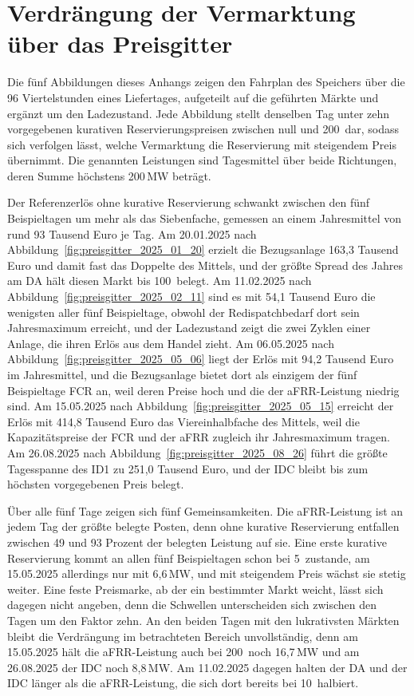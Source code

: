 \chapter{Verdrängung der Vermarktung über das Preisgitter}
\label{anh:preisgitter}

Die fünf Abbildungen dieses Anhangs zeigen den Fahrplan des Speichers über die 96 Viertelstunden eines Liefertages, aufgeteilt auf die geführten Märkte und ergänzt um den Ladezustand. Jede Abbildung stellt denselben Tag unter zehn vorgegebenen kurativen Reservierungspreisen zwischen null und 200\,\EurMWh{} dar, sodass sich verfolgen lässt, welche Vermarktung die Reservierung mit steigendem Preis übernimmt. Die genannten Leistungen sind Tagesmittel über beide Richtungen, deren Summe höchstens 200\,\si{MW} beträgt.

Der Referenzerlös ohne kurative Reservierung schwankt zwischen den fünf Beispieltagen um mehr als das Siebenfache, gemessen an einem Jahresmittel von rund 93 Tausend Euro je Tag. Am 20.01.2025 nach Abbildung~\ref{fig:preisgitter_2025_01_20} erzielt die Bezugsanlage 163,3 Tausend Euro und damit fast das Doppelte des Mittels, und der größte Spread des Jahres am \ac{DA} hält diesen Markt bis 100\,\EurMWh{} belegt. Am 11.02.2025 nach Abbildung~\ref{fig:preisgitter_2025_02_11} sind es mit 54,1 Tausend Euro die wenigsten aller fünf Beispieltage, obwohl der Redispatchbedarf dort sein Jahresmaximum erreicht, und der Ladezustand zeigt die zwei Zyklen einer Anlage, die ihren Erlös aus dem Handel zieht. Am 06.05.2025 nach Abbildung~\ref{fig:preisgitter_2025_05_06} liegt der Erlös mit 94,2 Tausend Euro im Jahresmittel, und die Bezugsanlage bietet dort als einzigem der fünf Beispieltage \ac{FCR} an, weil deren Preise hoch und die der \ac{aFRR}-Leistung niedrig sind. Am 15.05.2025 nach Abbildung~\ref{fig:preisgitter_2025_05_15} erreicht der Erlös mit 414,8 Tausend Euro das Viereinhalbfache des Mittels, weil die Kapazitätspreise der \ac{FCR} und der \ac{aFRR} zugleich ihr Jahresmaximum tragen. Am 26.08.2025 nach Abbildung~\ref{fig:preisgitter_2025_08_26} führt die größte Tagesspanne des \ac{ID1} zu 251,0 Tausend Euro, und der \ac{IDC} bleibt bis zum höchsten vorgegebenen Preis belegt.

Über alle fünf Tage zeigen sich fünf Gemeinsamkeiten. Die \ac{aFRR}-Leistung ist an jedem Tag der größte belegte Posten, denn ohne kurative Reservierung entfallen zwischen 49 und 93 Prozent der belegten Leistung auf sie. Eine erste kurative Reservierung kommt an allen fünf Beispieltagen schon bei 5\,\EurMWh{} zustande, am 15.05.2025 allerdings nur mit 6,6\,\si{MW}, und mit steigendem Preis wächst sie stetig weiter. Eine feste Preismarke, ab der ein bestimmter Markt weicht, lässt sich dagegen nicht angeben, denn die Schwellen unterscheiden sich zwischen den Tagen um den Faktor zehn. An den beiden Tagen mit den lukrativsten Märkten bleibt die Verdrängung im betrachteten Bereich unvollständig, denn am 15.05.2025 hält die \ac{aFRR}-Leistung auch bei 200\,\EurMWh{} noch 16,7\,\si{MW} und am 26.08.2025 der \ac{IDC} noch 8,8\,\si{MW}. Am 11.02.2025 dagegen halten der \ac{DA} und der \ac{IDC} länger als die \ac{aFRR}-Leistung, die sich dort bereits bei 10\,\EurMWh{} halbiert.

